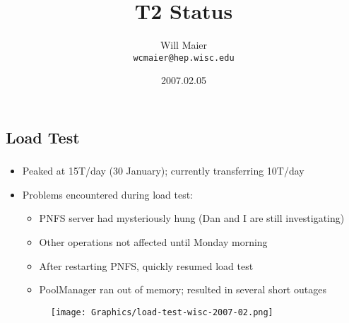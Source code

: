 \documentclass{beamer}
\title{T2 Status}
\author[Will Maier]{Will Maier \\ \texttt{wcmaier@hep.wisc.edu}}
\institute[Wisconsin]{University of Wisconsin}
\date{2007.02.05}
\newcommand{\newframe}[1]{\section{#1}
    \frametitle{\sc{#1}}}
\begin{document}

\begin{frame}
\newframe{Load Test}
\begin{itemize}
    \item Peaked at 15T/day (30 January); currently transferring 10T/day
    \item Problems encountered during load test:
    \begin{itemize}
        \item PNFS server had mysteriously hung (Dan and I are still investigating)
        \item Other operations not affected until Monday morning
        \item After restarting PNFS, quickly resumed load test
        \item PoolManager ran out of memory; resulted in several short outages
    \end{itemize}

    \begin{center}
    \begin{figure}
        \texttt{[image: Graphics/load-test-wisc-2007-02.png]}
    \end{figure}
    \end{center}
\end{itemize}
\end{frame}
\end{document}
